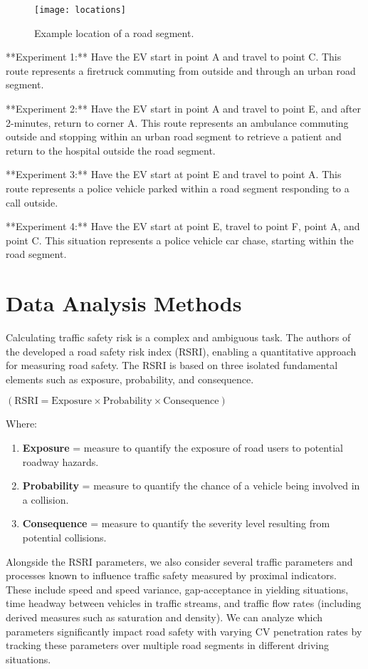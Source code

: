 \begin{figure}
\texttt{[image: locations]}
\caption{Example location of a road segment.}
\label{fig:locations}
\end{figure}

**Experiment 1:**
Have the \acrshort{EV} start in point A and travel to point C.
This route represents a firetruck commuting from outside and through an urban road segment.

**Experiment 2:**
Have the \acrshort{EV} start in point A and travel to point E, and after 2-minutes, return to corner A.
This route represents an ambulance commuting outside and stopping within an urban road segment to retrieve a patient and return to the hospital outside the road segment.

**Experiment 3:**
Have the \acrshort{EV} start at point E and travel to point A.
This route represents a police vehicle parked within a road segment responding to a call outside.

**Experiment 4:**
Have the \acrshort{EV} start at point E, travel to point F, point A, and point C.
This situation represents a police vehicle car chase, starting within the road segment.

\section{Data Analysis Methods}

Calculating traffic safety risk is a complex and ambiguous task. The authors of the \cite{leur_sayed_2002} developed a road safety risk index (RSRI), enabling a quantitative approach for measuring road safety. The RSRI is based on three isolated fundamental elements such as exposure, probability, and consequence.

$( \text{RSRI} = \text{Exposure} \times \text{Probability} \times \text{Consequence} )$

Where:
\begin{enumerate}
\item \textbf{Exposure} = measure to quantify the exposure of road users to potential roadway hazards.
\item \textbf{Probability} = measure to quantify the chance of a vehicle being involved in a collision.
\item \textbf{Consequence} = measure to quantify the severity level resulting from potential collisions.
\end{enumerate}

Alongside the RSRI parameters, we also consider several traffic parameters and processes known to influence traffic safety measured by proximal indicators. These include speed and speed variance, gap-acceptance in yielding situations, time headway between vehicles in traffic streams, and traffic flow rates (including derived measures such as saturation and density). We can analyze which parameters significantly impact road safety with varying CV penetration rates by tracking these parameters over multiple road segments in different driving situations.

